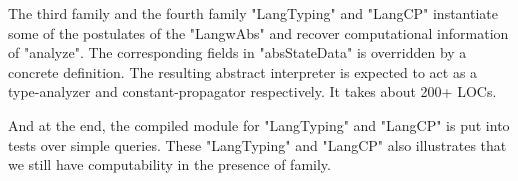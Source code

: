 The third family and the fourth family "LangTyping" and "LangCP" instantiate some of the postulates of the
"LangwAbs" and recover computational information of "analyze". The corresponding fields in "absStateData" is overridden by a concrete definition. The resulting abstract interpreter is expected
to act as a type-analyzer and constant-propagator respectively. It takes about 200+ LOCs. 


And at the end, the compiled module for "LangTyping" and "LangCP" is put into tests over simple queries. These "LangTyping" and "LangCP" also illustrates that we still have
computability in the presence of family.

